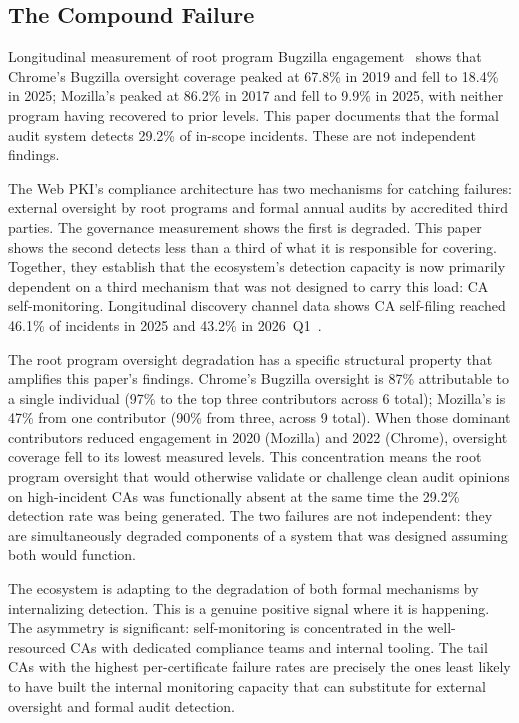 \documentclass[10pt,twocolumn,letterpaper]{article}
\begin{document}
\subsection{The Compound Failure}

Longitudinal measurement of root program Bugzilla engagement~\cite{sister}
shows that Chrome's Bugzilla oversight coverage peaked at 67.8\% in 2019 and fell
to 18.4\% in 2025; Mozilla's peaked at 86.2\% in 2017 and fell to 9.9\%
in 2025, with neither program having recovered to prior levels. This paper
documents that the formal audit system detects 29.2\% of in-scope incidents.
These are not independent findings.

The Web PKI's compliance architecture has two mechanisms for catching
failures: external oversight by root programs and formal annual audits
by accredited third parties. The governance measurement shows the first is
degraded. This paper shows the second detects less than a third of
what it is responsible for covering. Together, they establish that
the ecosystem's detection capacity is now primarily dependent on a
third mechanism that was not designed to carry this load: CA
self-monitoring. Longitudinal discovery channel data shows CA self-filing
reached 46.1\% of incidents in 2025 and 43.2\% in 2026~Q1~\cite{sister}.

The root program oversight degradation has a specific structural property
that amplifies this paper's findings. Chrome's Bugzilla oversight is 87\%
attributable to a single individual (97\% to the top three contributors across 6
total); Mozilla's is 47\% from one contributor (90\% from three,
across 9 total). When those dominant
contributors reduced engagement in 2020 (Mozilla) and 2022 (Chrome),
oversight coverage fell to its lowest measured levels. This concentration
means the root program oversight that would otherwise validate or
challenge clean audit opinions on high-incident CAs was functionally
absent at the same time the 29.2\% detection rate was being
generated. The two failures are not independent: they are simultaneously
degraded components of a system that was designed assuming both
would function.

The ecosystem is adapting to the degradation of both formal mechanisms
by internalizing detection. This is a genuine positive signal where
it is happening. The asymmetry is significant: self-monitoring is
concentrated in the well-resourced CAs with dedicated compliance teams
and internal tooling. The tail CAs
with the highest per-certificate failure rates
are precisely the
ones least likely to have built the internal monitoring capacity that
can substitute for external oversight and formal audit detection.
\end{document}
